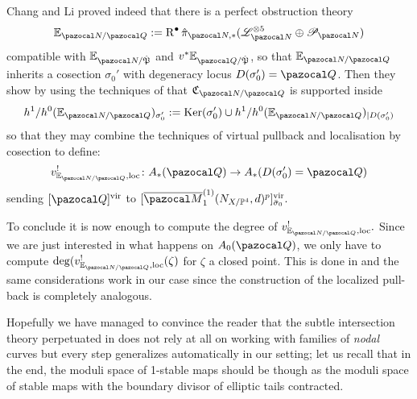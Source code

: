 \documentclass[11pt]{amsart}
\newcommand{\Mone}[3]{\overline{\pazocal M}^{(1)}_{#1}(#2,#3)}
\newcommand{\PP}{\mathbb P}
\renewcommand{\to}{\rightarrow}
\newcommand{\hP}{\hat{\mathfrak P}}
\newcommand{\R}{\operatorname{R}}
\theoremstyle{plain}
\theoremstyle{definition}
\begin{document}
Chang and Li proved indeed that there is a perfect obstruction theory 
\[\mathbb E_{\pazocal N/\pazocal Q}:=\R^{\bullet}\hat\pi_{\pazocal N,*}(\mathcal L^{\otimes 5}_{\pazocal N}\oplus \mathcal P_{\pazocal N})\]
 compatible with $\mathbb E_{\pazocal N/\hP}$ and $v^*\mathbb E_{\pazocal Q/\hP}$, so that $\mathbb E_{\pazocal N/\pazocal Q}$ inherits a cosection $\sigma_0'$ with degeneracy locus $D(\sigma_0')=\pazocal Q$. Then \cite[Lemma 5.5]{CLpfields} they show by using the techniques of \cite{KKP} that $\mathfrak C_{\pazocal N/\pazocal Q}$ is supported inside 
\[
 h^1/h^0(\mathbb E_{\pazocal N/\pazocal Q})_{\sigma_0'}:=\operatorname{Ker}(\sigma_0')\cup  h^1/h^0(\mathbb E_{\pazocal N/\pazocal Q})_{|D(\sigma_0')}
\]
so that they may combine the techniques of virtual pullback \cite{Manolache-pullback} and localisation by cosection \cite{KLcosection} to define:
\[
 v^!_{\mathbb E_{\pazocal N/\pazocal Q},\rm{loc}}\colon A_*(\pazocal Q)\to A_*(D(\sigma_0')=\pazocal Q)
\]
sending $[\pazocal Q]^{\rm{vir}}$ to $[\Mone{1}{N_{X/\PP^4}}{d}^p]^{\rm{vir}}_{\rm{\bar\sigma_0}}.$

To conclude it is now enough to compute the degree of $v^!_{\mathbb E_{\pazocal N/\pazocal Q},\rm{loc}}.$
Since we are just interested in what happens on $A_0(\pazocal Q)$, we only have to compute $\deg(v^!_{\mathbb E_{\pazocal N/\pazocal Q},\rm{loc}}(\zeta)$ for $\zeta$ a closed point. This is done in \cite[Theorem 5.7]{CLpfields} and the same considerations work in our case since the construction of the localized pull-back is completely analogous.

Hopefully we have managed to convince the reader that the subtle intersection theory perpetuated in \cite{CLpfields} does not rely at all on working with families of \emph{nodal} curves but every step generalizes automatically in our setting; let us recall that in the end, the moduli space of 1-stable maps should be though as the moduli space of stable maps with the boundary divisor of elliptic tails contracted.
\end{document}
